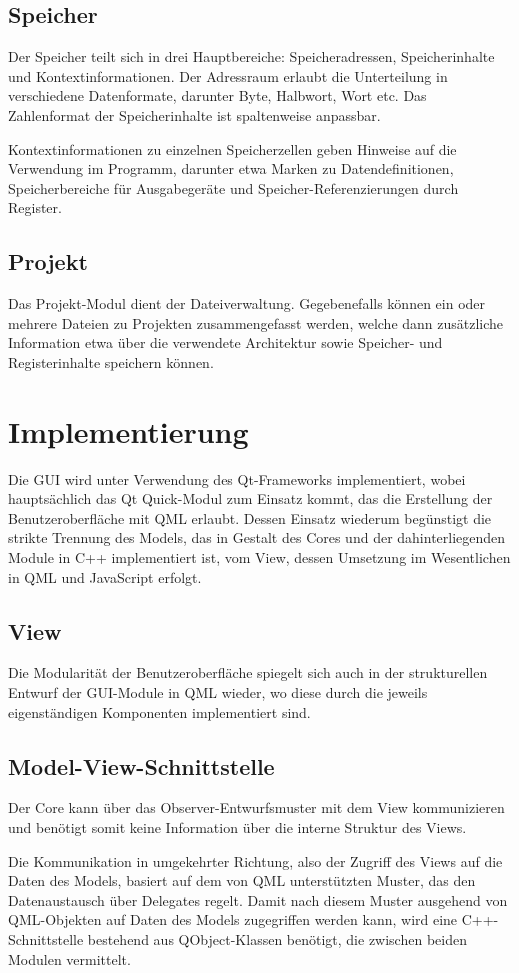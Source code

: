 \subsection{Speicher}

Der Speicher teilt sich in drei Hauptbereiche: Speicheradressen, Speicherinhalte und Kontextinformationen.
Der Adressraum erlaubt die Unterteilung in verschiedene Datenformate, darunter Byte, Halbwort, Wort etc.
Das Zahlenformat der Speicherinhalte ist spaltenweise anpassbar.

Kontextinformationen zu einzelnen Speicherzellen geben Hinweise auf die Verwendung im Programm, darunter etwa Marken zu Datendefinitionen, Speicherbereiche für Ausgabegeräte und Speicher-Referenzierungen durch Register.

\subsection{Projekt}

Das Projekt-Modul dient der Dateiverwaltung. Gegebenefalls können ein oder mehrere Dateien zu Projekten zusammengefasst werden, welche dann zusätzliche Information etwa über die verwendete Architektur sowie Speicher- und Registerinhalte speichern können.

\section{Implementierung}

Die GUI wird unter Verwendung des Qt-Frameworks implementiert, wobei hauptsächlich das Qt Quick-Modul zum Einsatz kommt, das die Erstellung der Benutzeroberfläche mit QML erlaubt. Dessen Einsatz wiederum begünstigt die strikte Trennung des Models, das in Gestalt des Cores und der dahinterliegenden Module in C++ implementiert ist, vom View, dessen Umsetzung im Wesentlichen in QML und JavaScript erfolgt.

\subsection{View}

Die Modularität der Benutzeroberfläche spiegelt sich auch in der strukturellen Entwurf der GUI-Module in QML wieder, wo diese durch die jeweils eigenständigen Komponenten implementiert sind.

\subsection{Model-View-Schnittstelle}

Der Core kann über das Observer-Entwurfsmuster mit dem View kommunizieren und benötigt somit keine Information über die interne Struktur des Views.

Die Kommunikation in umgekehrter Richtung, also der Zugriff des Views auf die Daten des Models, basiert auf dem von QML unterstützten Muster, das den Datenaustausch über Delegates regelt. Damit nach diesem Muster ausgehend von QML-Objekten auf Daten des Models zugegriffen werden kann, wird eine C++-Schnittstelle bestehend aus QObject-Klassen benötigt, die zwischen beiden Modulen vermittelt.
